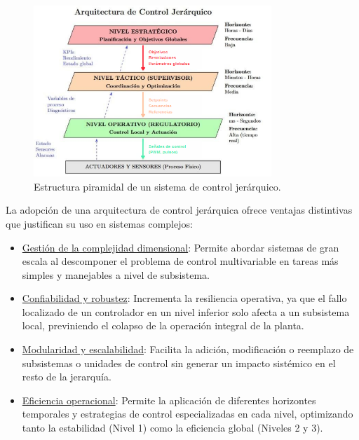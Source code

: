 \begin{figure}[H]
    \centering
    \includegraphics[width=0.8\textwidth]{img/jerarquia_control.png}
    \caption{Estructura piramidal de un sistema de control jerárquico.}
    \label{fig:jerarquia_control}
\end{figure}
La adopción de una arquitectura de control jerárquica ofrece ventajas distintivas que justifican su uso en sistemas complejos:
\begin{itemize}[label=$\bullet$]
    \item \underline{Gestión de la complejidad dimensional}: Permite abordar sistemas de gran escala al descomponer el problema de control multivariable en tareas más simples y manejables a nivel de subsistema.
    \item \underline{Confiabilidad y robustez}: Incrementa la resiliencia operativa, ya que el fallo localizado de un controlador en un nivel inferior solo afecta a un subsistema local, previniendo el colapso de la operación integral de la planta.
    \item \underline{Modularidad y escalabilidad}: Facilita la adición, modificación o reemplazo de subsistemas o unidades de control sin generar un impacto sistémico en el resto de la jerarquía.
    \item \underline{Eficiencia operacional}: Permite la aplicación de diferentes horizontes temporales y estrategias de control especializadas en cada nivel, optimizando tanto la estabilidad (Nivel 1) como la eficiencia global (Niveles 2 y 3).
\end{itemize}